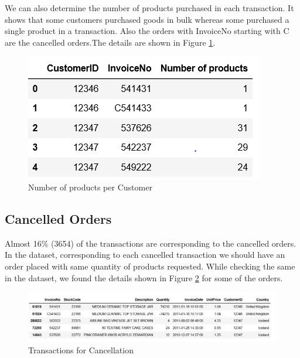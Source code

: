 We can also determine the number of products purchased in each transaction. It shows that some customers purchased goods in bulk whereas some purchased a single product in a transaction.
Also the orders with InvoiceNo starting with C are the cancelled orders.The details are shown in Figure \ref{2.2}.

\begin{figure}
\caption{Number of products per Customer}
\label{2.2}
\centering
\includegraphics[width=\columnwidth]{images/2_2.PNG}
\end{figure}

\subsection{Cancelled Orders}

Almost 16\% (3654) of the transactions are corresponding to the cancelled orders. In the dataset, corresponding to each cancelled transaction we should have an order placed with same quantity of products requested. While checking the same in the dataset, we found the details shown in Figure \ref{2.3} for some of the orders.\\

\begin{figure}
\caption{Transactions for Cancellation}
\label{2.3}
\centering
\includegraphics[width=\columnwidth]{images/2_3.PNG}
\end{figure}

